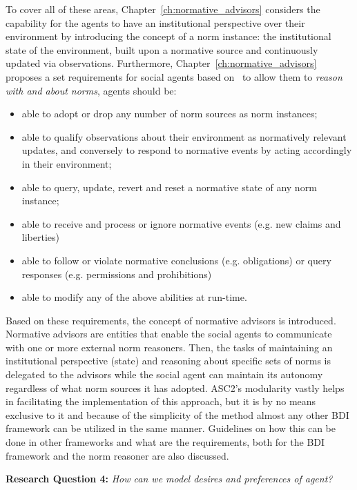 To cover all of these areas, Chapter~\ref{ch:normative_advisors} considers the capability for the agents to have an institutional perspective over their environment by introducing the concept of a norm instance: the institutional state of the environment, built upon a normative source and continuously updated via observations. Furthermore,  Chapter~\ref{ch:normative_advisors} proposes a set requirements for social agents based on~\cite{Boella2006IntroductionSystems} to allow them to \textit{reason with and about norms}, agents should be:
\begin{itemize}
    \item able to adopt or drop any number of norm sources as norm instances;
    \item able to qualify observations about their environment as normatively relevant updates, and conversely to respond to normative events by acting accordingly in their environment;
    \item able to query, update, revert and reset a normative state of any norm
instance;
    \item able to receive and process or ignore normative events (e.g. new claims and
liberties)
    \item able to follow or violate normative conclusions (e.g. obligations) or query
responses (e.g. permissions and prohibitions)
    \item able to modify any of the above abilities at run-time.
\end{itemize}

Based on these requirements, the concept of normative advisors is introduced. Normative advisors are entities that enable the social agents to communicate with one or more external norm reasoners. Then, the tasks of maintaining an institutional perspective (state) and reasoning about specific sets of norms is delegated to the advisors while the social agent can maintain its autonomy regardless of what norm sources it has adopted. ASC2's modularity vastly helps in facilitating the implementation of this approach, but it is by no means exclusive to it and because of the simplicity of the method almost any other BDI framework can be utilized in the same manner. Guidelines on how this can be done in other frameworks and what are the requirements, both for the BDI framework and the norm reasoner are also discussed.

\begin{displayquote}
\textbf{Research Question 4:} \textit{How can we model desires and preferences of agent?}
\end{displayquote}

